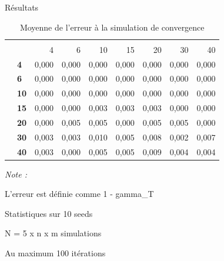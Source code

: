 \documentclass[10pt,xcolor=table,color={dvipsnames,usenames},ignorenonframetext,usepdftitle=false,french]{beamer}
\begin{document}
\begin{frame}{Résultats}
\protect\hypertarget{ruxe9sultats-2}{}

\begin{table}

\caption{\label{tab:tabq1erreur}Moyenne de l'erreur à la simulation de convergence}
\centering
\begin{threeparttable}
\begin{tabular}[t]{>{\bfseries}l|>{\bfseries}l|r|r|r|r|r|r|r}
\hline
\multicolumn{2}{c|}{ } & \multicolumn{7}{c}{m} \\
\cline{3-9}
  &    & 4 & 6 & 10 & 15 & 20 & 30 & 40\\
\hline
 & 4 & 0,000 & 0,000 & 0,000 & 0,000 & 0,000 & 0,000 & 0,000\\
\cline{2-9}
 & 6 & 0,000 & 0,000 & 0,000 & 0,000 & 0,000 & 0,000 & 0,000\\
\cline{2-9}
 & 10 & 0,000 & 0,000 & 0,000 & 0,000 & 0,000 & 0,000 & 0,000\\
\cline{2-9}
 & 15 & 0,000 & 0,000 & 0,003 & 0,003 & 0,003 & 0,000 & 0,000\\
\cline{2-9}
 & 20 & 0,000 & 0,005 & 0,005 & 0,000 & 0,005 & 0,005 & 0,000\\
\cline{2-9}
 & 30 & 0,003 & 0,003 & 0,010 & 0,005 & 0,008 & 0,002 & 0,007\\
\cline{2-9}
\multirow{-7}{*}{\raggedright\arraybackslash n} & 40 & 0,003 & 0,000 & 0,005 & 0,005 & 0,009 & 0,004 & 0,004\\
\hline
\end{tabular}
\begin{tablenotes}
\item \textit{Note : } 
\item L'erreur est définie comme 1 - gamma\_T
\item Statistiques sur 10 seeds
\item N = 5 x n x m simulations
\item Au maximum 100 itérations
\end{tablenotes}
\end{threeparttable}
\end{table}

\end{frame}
\end{document}
